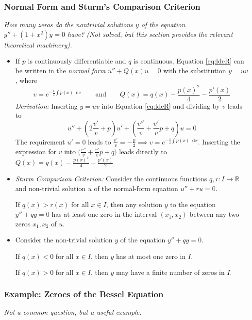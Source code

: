 \documentclass[11pt, a4paper]{article}
\newcommand{\question}[1]{\textit{#1}\vspace{2mm}}
\newcommand{\R}{\mathbb{R}} %
\newcommand{\diff}{\mathop{}\!\mathrm{d}} %
\begin{document}
\subsubsection{Normal Form and Sturm's Comparison Criterion}
\question{How many zeros do the nontrivial solutions $ y $ of the equation $ y'' + (1+x^2)y = 0 $ have? (Not solved, but this section provides the relevant theoretical machinery).}
\begin{itemize}
	\item If $ p $ is continuously differentiable and $ q $ is continuous, Equation \ref{eq:ldeR} can be written in the \textit{normal form} $ u'' + Q(x)u = 0 $ with the substitution $ y = uv $, where
	\begin{equation*}
		v = e^{-\frac{1}{2} \int p(x) \diff x }\qquad \text{and}
		\qquad Q(x) = q(x) - \frac{p(x)^2}{4} - \frac{p'(x)}{2}
	\end{equation*}
	\textit{Derivation:} Inserting $ y = uv $ into Equation \ref{eq:ldeR} and dividing by $ v $ leads to
	\begin{equation*}
		u'' + \left(2\frac{v'}{v} + p\right)u' + \left(\frac{v''}{v} + \frac{v'}{v}p + q\right)u = 0
	\end{equation*}
	The requirement $ u' = 0 $ leads to $ \frac{v'}{v} = -\frac{p}{2} \implies v = e^{-\frac{1}{2}\int p(x)\diff x}$. Inserting the expression for $ v $ into $ \big(\frac{v''}{v} + \frac{v'}{v}p + q\big) $ leads directly to $ Q(x) = q(x) - \frac{p(x)^2}{4} - \frac{p'(x)}{2} $
	
	\item \textit{Sturm Comparison Criterion:} Consider the continuous functions $ q, r: I \to \R $ and non-trivial solution $ u $ of the normal-form equation $ u'' + r u = 0 $.
	
	If $ q(x) > r(x)$ for all $ x \in I $, then any solution $ y $ to the equation $ y'' + qy = 0 $ has at least one zero in the interval $ (x_1, x_2) $ between any two zeros $ x_1, x_2 $ of $ u $.
	
	\item Consider the non-trivial solution $ y $ of the equation $ y'' + qy = 0 $. 
	
	If $ q(x) < 0 $ for all $ x \in I $, then $ y $ has at most one zero in $ I $.
	
	If $ q(x) > 0 $ for all $ x \in I $, then $ y $ may have a finite number of zeros in $ I $.
\end{itemize}



\subsubsection{Example: Zeroes of the Bessel Equation}
\question{Not a common question, but a useful example.}
\end{document}
